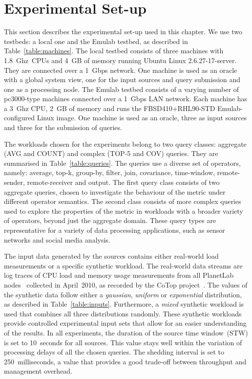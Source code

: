 \section{Experimental Set-up}

This section describes the experimental set-up used in this chapter. We use two testbeds: a local one and
the Emulab testbed, as described in Table~\ref{table:machines}. The local testbed consists of three
machines with 1.8~Ghz~CPUs and 4~GB of memory running Ubuntu Linux 2.6.27-17-server. They are connected
over a 1~Gbps network.
One machine is used as an oracle with a global system view, one for the input sources and query
submission and one as a processing node.
The Emulab testbed consists of a varying number of pc3000-type machines connected over a 1~Gbps LAN network. 
Each machine has a 3~Ghz CPU, 2~GB of memory and runs the FBSD410+RHL90-STD Emulab-configured Linux
image. One machine is used as an oracle, three as input sources and three for the submission of queries.




The workloads chosen for the experiments belong to two query classes:  
aggregate (\ie \textnormal{AVG}
and \textnormal{COUNT}) and complex (\ie \textnormal{TOP-5} and 
\textnormal{COV}) queries. They are summarised in Table~\ref{table:queries}. 
The queries use a diverse set of operators, namely: \textnormal{average}, 
\textnormal{top-k}, \textnormal{group-by}, \textnormal{filter}, \textnormal{join}, \textnormal{covariance}, 
\textnormal{time-window}, \textnormal{remote-sender}, \textnormal{remote-receiver} 
and \textnormal{output}. The first query class consists of two aggregate queries, chosen to
investigate the behaviour of the \sic metric under different operator semantics. 
The second class consists of more complex queries used to explore the properties of the \sic metric in
workloads with a broader variety of operators, beyond just the aggregate domain.
These query types are representative for a variety of data processing applications, such as sensor
networks and social media analysis.

The input data generated by the sources contains either real-world load measurements or a specific
synthetic workload.
The real-world data streams are log traces of CPU load and memory usage measurements from all PlanetLab
nodes~\cite{planetlab} collected in April~2010, as recorded by the CoTop
project~\cite{cotop}.
The values of the synthetic data follow either a \emph{gaussian}, \emph{uniform} or \emph{exponential}
distribution, as described in Table~\ref{table:inputs}.
Furthermore, a \emph{mixed} synthetic workload is used that combines all three distributions randomly.
These synthetic workloads provide controlled experimental input sets that allow for an easier understanding of the results. 
In all experiments, the duration of the source time window~(STW) is set to 10~seconds for all
sources. This value stays well within the variation of processing delays of all the chosen queries.
The shedding interval is set to 250~milliseconds, a value that provides a good trade-off between
throughput and management overhead.

